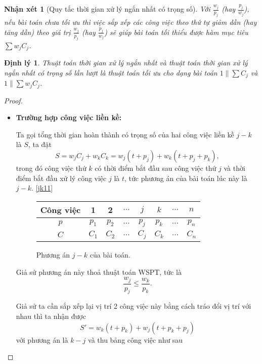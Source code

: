 \documentclass[12pt,a4paper]{report}
\newtheorem{dl}{Định lý}
\newtheorem{nx}{Nhận xét}
\begin{document}
\begin{nx}[Quy tắc thời gian xử lý ngắn nhất có trọng số]
Với $\frac{w_j}{p_j}$ (hay $\frac{p_j}{w_j}$), nếu bài toán chưa tối ưu thì việc sắp xếp các công việc theo thứ tự giảm dần (hay tăng dần) theo giá trị $\frac{w_j}{p_j}$ (hay $\frac{p_j}{w_j}$) sẽ giúp bài toán tối thiểu được hàm mục tiêu $\sum w_j C_j$.
\end{nx}

\begin{dl}
	Thuật toán thời gian xử lý ngắn nhất và thuật toán thời gian xử lý ngắn nhất có trọng số lần lượt là thuật toán tối ưu cho dạng bài toán $1 \| \sum C_j$ và $1 \| \sum w_j C_j$.
\end{dl}

\begin{proof}

\phantom{text}

\begin{itemize}
\item \textbf{Trường hợp công việc liền kề:}

	Ta gọi tổng thời gian hoàn thành có trọng số của hai công việc liền kề $j-k$ là $S$, ta đặt
	\begin{equation} \label{S}
		S = w_j C_j + w_k C_k = w_j(t+p_j) + w_k(t+p_j+p_k),
	\end{equation}
	trong đó công việc thứ $k$ có thời điểm bắt đầu sau công việc thứ $j$ và thời điểm bắt đầu xử lý công việc $j$ là $t$, tức phương án của bài toán lúc này là $j - k$. \eqref{jk11}
	
	\begin{figure}[h!]
		\centering
		 \begin{tabular}{|c | c c c c c c c |} 
		 \hline
		 Công việc & 1 & 2 & $\ldots$ & $j$ & $k$ & $\ldots$ & $n$ \\
		 \hline\hline
		 $p$ & $p_1$ & $p_2$ & $\ldots$ & $p_j$ & $p_k$ & $\ldots$ & $p_n$ \\
		 $C$ & $C_1$ & $C_2$ & $\ldots$ & $C_j$ & $C_k$ & $\ldots$ & $C_n$ \\
		 \hline
		 \end{tabular}
	\caption{\label{jk11}Phương án $j - k$ của bài toán.}
	\end{figure}
	
	Giả sử phương án này thoả thuật toán WSPT, tức là
	\begin{equation}
	\frac{w_j}{p_j} \leq \frac{w_k}{p_k}.
	\end{equation}
	
	Giả sử ta cần sắp xếp lại vị trí 2 công việc này bằng cách tráo đổi vị trí với nhau thì ta nhận được
	\begin{equation} \label{S'}
		S' = w_k(t+p_k) + w_j(t+p_k+p_j)
	\end{equation}
	với phương án là $k-j$ và thu bảng công việc như sau
	

\end{itemize}
\end{proof}
\end{document}
